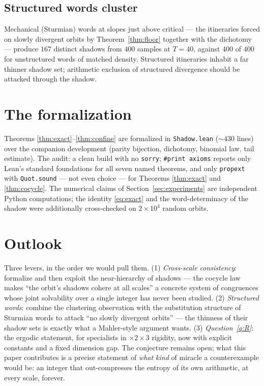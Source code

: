 \documentclass[11pt]{article}
\newcommand{\code}[1]{\texttt{#1}}
\begin{document}
\subsection*{Structured words cluster}

Mechanical (Sturmian) words at slopes just above critical --- the
itineraries forced on slowly divergent orbits by
Theorem~\ref{thm:floor} together with the dichotomy --- produce $167$
distinct shadows from $400$ samples at $T = 40$, against $400$ of
$400$ for unstructured words of matched density. Structured
itineraries inhabit a far thinner shadow set; arithmetic exclusion of
structured divergence should be attacked through the shadow.

\section{The formalization}\label{sec:formal}

Theorems \ref{thm:exact}--\ref{thm:confine} are formalized in
\code{Shadow.lean} ($\sim$430 lines) over the companion development
\cite{companion} (parity bijection, dichotomy, binomial law, tail
estimate). The audit: a clean build with no \code{sorry};
\code{\#print axioms} reports only Lean's standard foundations for all
seven named theorems, and only \code{propext} with \code{Quot.sound}
--- not even choice --- for Theorems \ref{thm:exact} and
\ref{thm:cocycle}. The numerical claims of
Section~\ref{sec:experiments} are independent Python computations; the
identity \eqref{eq:exact} and the word-determinacy of the shadow were
additionally cross-checked on $2 \times 10^4$ random orbits.

\section{Outlook}

Three levers, in the order we would pull them. (1) \emph{Cross-scale
consistency}: formalize and then exploit the near-hierarchy of shadows
--- the cocycle law makes ``the orbit's shadows cohere at all scales''
a concrete system of congruences whose joint solvability over a single
integer has never been studied. (2) \emph{Structured words}: combine
the clustering observation with the substitution structure of Sturmian
words to attack ``no slowly divergent orbits'' --- the thinness of
their shadow sets is exactly what a Mahler-style argument wants.
(3) \emph{Question~\ref{q:R}}: the ergodic statement, for specialists
in $\times 2 \times 3$ rigidity, now with explicit constants and a
fixed dimension gap. The conjecture remains open; what this paper
contributes is a precise statement of \emph{what kind} of miracle a
counterexample would be: an integer that out-compresses the entropy of
its own arithmetic, at every scale, forever.
\end{document}
